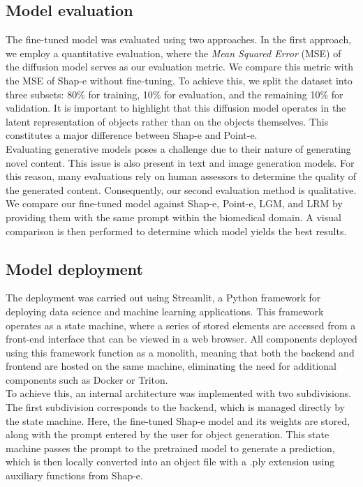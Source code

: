 \documentclass[journal]{IEEEtran}
\begin{document}
\subsection{Model evaluation}

The fine-tuned model was evaluated using two approaches. In the first approach, we employ a quantitative evaluation, where the \textit{Mean Squared Error} (MSE) of the diffusion model serves as our evaluation metric. We compare this metric with the MSE of Shap-e without fine-tuning. To achieve this, we split the dataset into three subsets: 80\% for training, 10\% for evaluation, and the remaining 10\% for validation. It is important to highlight that this diffusion model operates in the latent representation of objects rather than on the objects themselves. This constitutes a major difference between Shap-e and Point-e. \\ 

Evaluating generative models poses a challenge due to their nature of generating novel content. This issue is also present in text and image generation models. For this reason, many evaluations rely on human assessors to determine the quality of the generated content. Consequently, our second evaluation method is qualitative. We compare our fine-tuned model against Shap-e, Point-e, LGM, and LRM by providing them with the same prompt within the biomedical domain. A visual comparison is then performed to determine which model yields the best results.

\subsection{Model deployment}

The deployment was carried out using Streamlit, a Python framework for deploying data science and machine learning applications. This framework operates as a state machine, where a series of stored elements are accessed from a front-end interface that can be viewed in a web browser. All components deployed using this framework function as a monolith, meaning that both the backend and frontend are hosted on the same machine, eliminating the need for additional components such as Docker or Triton. \\ 

To achieve this, an internal architecture was implemented with two subdivisions. The first subdivision corresponds to the backend, which is managed directly by the state machine. Here, the fine-tuned Shap-e model and its weights are stored, along with the prompt entered by the user for object generation. This state machine passes the prompt to the pretrained model to generate a prediction, which is then locally converted into an object file with a .ply extension using auxiliary functions from Shap-e.  \\
\end{document}
